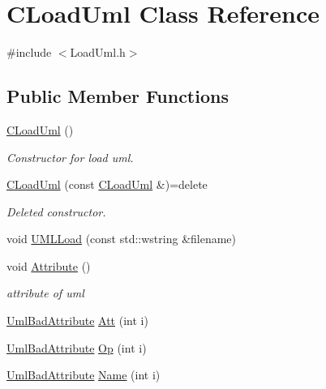 \hypertarget{class_c_load_uml}{}\section{C\+Load\+Uml Class Reference}
\label{class_c_load_uml}


{\ttfamily \#include $<$Load\+Uml.\+h$>$}

\subsection*{Public Member Functions}
\begin{DoxyCompactItemize}
\item 
\mbox{\label{class_c_load_uml_a9d1de4c1f34cc16e63f87e1f609d233b}} 
\mbox{\hyperlink{class_c_load_uml_a9d1de4c1f34cc16e63f87e1f609d233b}{C\+Load\+Uml}} ()
\begin{DoxyCompactList}\small\item\em Constructor for load uml. \end{DoxyCompactList}\item 
\mbox{\label{class_c_load_uml_a223afc2ce39b51b6d452f6755fa9b463}} 
\mbox{\hyperlink{class_c_load_uml_a223afc2ce39b51b6d452f6755fa9b463}{C\+Load\+Uml}} (const \mbox{\hyperlink{class_c_load_uml}{C\+Load\+Uml}} \&)=delete
\begin{DoxyCompactList}\small\item\em Deleted constructor. \end{DoxyCompactList}\item 
void \mbox{\hyperlink{class_c_load_uml_a176855f9408cda77d900529b144e4a28}{U\+M\+L\+Load}} (const std\+::wstring \&filename)
\item 
\mbox{\label{class_c_load_uml_a226a41e11e0c0afb5dae9f3563362b66}} 
void \mbox{\hyperlink{class_c_load_uml_a226a41e11e0c0afb5dae9f3563362b66}{Attribute}} ()
\begin{DoxyCompactList}\small\item\em attribute of uml \end{DoxyCompactList}\item 
\mbox{\hyperlink{class_uml_bad_attribute}{Uml\+Bad\+Attribute}} \mbox{\hyperlink{class_c_load_uml_ac006b1deb2a0ae1626462c0bfdfc56bf}{Att}} (int i)
\item 
\mbox{\hyperlink{class_uml_bad_attribute}{Uml\+Bad\+Attribute}} \mbox{\hyperlink{class_c_load_uml_a2350b0f38d9859b6bc26c3df774fcd3a}{Op}} (int i)
\item 
\mbox{\hyperlink{class_uml_bad_attribute}{Uml\+Bad\+Attribute}} \mbox{\hyperlink{class_c_load_uml_a8219fa45bf4cf94d454439f9a9f672f7}{Name}} (int i)
\end{DoxyCompactItemize}


